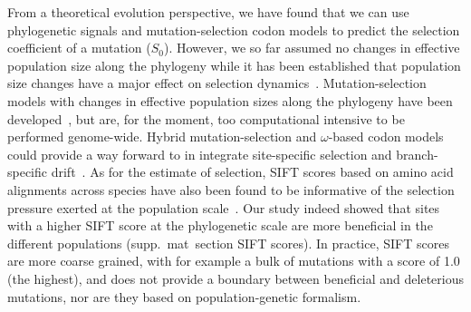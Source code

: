\documentclass{article}
\newcommand{\Sphy}{S_{0}}
\begin{document}
    From a theoretical evolution perspective, we have found that we can use phylogenetic signals and mutation-selection codon models to predict the selection coefficient of a mutation ($\Sphy$).
    However, we so far assumed no changes in effective population size along the phylogeny while it has been established that population size changes have a major effect on selection dynamics~\cite{lanfear_population_2014, jones_shifting_2017, platt_protein_2018}.
    Mutation-selection models with changes in effective population sizes along the phylogeny have been developed~\cite{latrille_inferring_2021a}, but are, for the moment, too computational intensive to be performed genome-wide.
    Hybrid mutation-selection and $\omega$-based codon models could provide a way forward to in integrate site-specific selection and branch-specific drift~\cite{brevet_reconstructing_2021a}.
    As for the estimate of selection, SIFT scores based on amino acid alignments across species have also been found to be informative of the selection pressure exerted at the population scale~\cite{chen_hunting_2021}.
    Our study indeed showed that sites with a higher SIFT score at the phylogenetic scale are more beneficial in the different populations (supp.\ mat\  section SIFT scores).
    In practice, SIFT scores are more coarse grained, with for example a bulk of mutations with a score of 1.0 (the highest), and does not provide a boundary between beneficial and deleterious mutations, nor are they based on population-genetic formalism.
\end{document}
